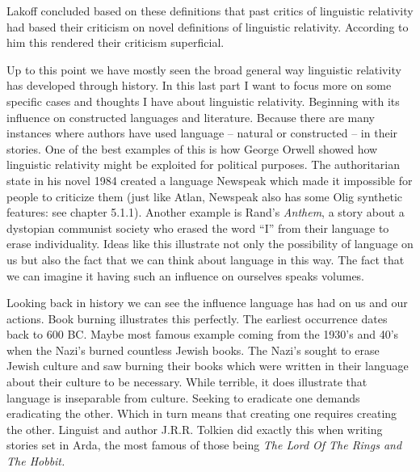 \noindent Lakoff concluded based on these definitions that past critics of linguistic relativity had based their criticism on novel definitions of linguistic relativity. According to him this rendered their criticism superficial. 

 
	Up to this point we have mostly seen the broad general way linguistic relativity has developed through history. In this last part I want to focus more on some specific cases and thoughts I have about linguistic relativity. Beginning with its influence on constructed languages and literature. Because there are many instances where authors have used language – natural or constructed – in their stories. One of the best examples of this is how George Orwell showed how linguistic relativity might be exploited for political purposes. The authoritarian state in his novel 1984 created a language Newspeak which made it impossible for people to criticize them (just like Atlan, Newspeak also has some Olig synthetic features: see chapter 5.1.1). Another example is Rand’s \textit{Anthem}, a story about a dystopian communist society who erased the word “I” from their language to erase individuality. Ideas like this illustrate not only the possibility of language on us but also the fact that we can think about language in this way. The fact that we can imagine it having such an influence on ourselves speaks volumes. 

  
	Looking back in history we can see the influence language has had on us and our actions. Book burning illustrates this perfectly. The earliest occurrence dates back to 600 BC. Maybe most famous example coming from the 1930’s and 40’s when the Nazi’s burned countless Jewish books. The Nazi’s sought to erase Jewish culture and saw burning their books which were written in their language about their culture to be necessary. While terrible, it does illustrate that language is inseparable from culture. Seeking to eradicate one demands eradicating the other. Which in turn means that creating one requires creating the other. Linguist and author J.R.R. Tolkien did exactly this when writing stories set in Arda, the most famous of those being \textit{The Lord Of The Rings and The Hobbit.} 

